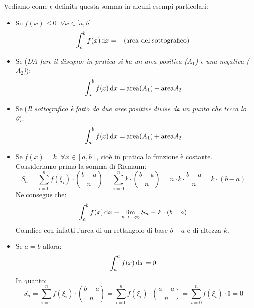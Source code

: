 Vediamo come è definita questa somma in alcuni esempi particolari:
\begin{itemize}
	\item Se $f(x) \leq 0 \;\; \forall x \in \mathbb[a, b]$
		\begin{equation*}
			\int_a^b f(x) \diff x = - (\text{area del sottografico}) %
		\end{equation*}

	\item Se (\textit{DA fare il disegno: in pratica si ha un area positiva ($A_1$) e una negativa ($A_2$)}):
		\begin{equation*}
			\int_a^b f(x) \diff x = \text{area}(A_1) - \text{area}{A_2}  %
		\end{equation*}

	\item Se (\textit{Il sottografico è fatto da due aree positive divise da un punto che tocca lo 0}):
		\begin{equation*}
			\int_a^b f(x) \diff x = \text{area}(A_1) + \text{area}{A_2}  %
		\end{equation*}

	\item Se $f(x) = k \;\; \forall x \in [a,b]$, cioè in pratica la funzione è costante. Consideriamo prima la somma di Riemann: 
		\begin{equation*}
			S_n = \sum \limits_{i = 0}^n f(\xi_i) \cdot \left(\dfrac{b-a}{n}\right) = \sum \limits_{i = 0}^n k \cdot \left(\dfrac{b-a}{n}\right) = n \cdot k \cdot \dfrac{b-a}{n} = k \cdot (b-a)
		\end{equation*}
		Ne consegue che:
		\begin{equation*}
			\int_a^b f(x) \,\text{d} x = \lim_{n \to +\infty} S_n = k \cdot (b-a)
		\end{equation*}
		Coindice con infatti l'area di un rettangolo di base $b-a$ e di altezza $k$. %
	
	\item Se $a = b$ allora:
		\begin{equation*}
			\int_a^a f(x) \,\text{d} x = 0
		\end{equation*}
		In quanto:
		\begin{equation*}
			S_n = \sum \limits_{i = 0}^n f(\xi_i) \cdot \left(\dfrac{b-a}{n}\right) = \sum \limits_{i = 0}^n f(\xi_i) \cdot \left(\dfrac{a-a}{n}\right) = \sum \limits_{i = 0}^n f(\xi_i) \cdot 0 = 0
		\end{equation*}
\end{itemize}

